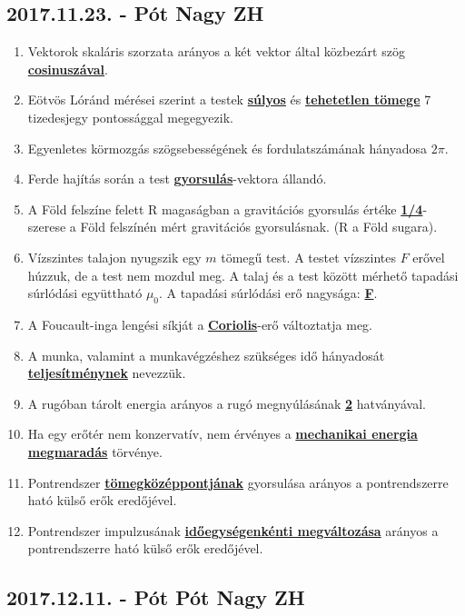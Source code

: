\documentclass[../../fizika_kerdesek.tex]{subfiles}
\begin{document}
    \subsection{2017.11.23. - Pót Nagy ZH}

        \begin{enumerate}
            \item Vektorok skaláris szorzata arányos a két vektor által közbezárt szög \underline{\textbf{cosinuszával}}.
            \item Eötvös Lóránd mérései szerint a testek \underline{\textbf{súlyos}} és \underline{\textbf{tehetetlen tömege}} 7 tizedesjegy pontossággal megegyezik.
            \item Egyenletes körmozgás szögsebességének és fordulatszámának hányadosa \textbf{\underline{$2\pi$}}.
            \item Ferde hajítás során a test \underline{\textbf{gyorsulás}}-vektora állandó.
            \item A Föld felszíne felett R magaságban a gravitációs gyorsulás értéke \underline{\textbf{1/4}}-szerese a Föld felszínén mért gravitációs gyorsulásnak. (R a Föld sugara).
            \item Vízszintes talajon nyugszik egy $m$ tömegű test. A testet vízszintes $F$ erővel húzzuk, de a test nem mozdul meg. A talaj és a test között mérhető tapadási súrlódási együttható $\mu_0$. A tapadási súrlódási erő nagysága: \underline{\textbf{F}}.
            \item A Foucault-inga lengési síkját a \underline{\textbf{Coriolis}}-erő változtatja meg. 
            \item A munka, valamint a munkavégzéshez szükséges idő hányadosát \underline{\textbf{teljesítménynek}} nevezzük.
            \item A rugóban tárolt energia arányos a rugó megnyúlásának \underline{\textbf{2}} hatványával.
            \item Ha egy erőtér nem konzervatív, nem érvényes a \underline{\textbf{mechanikai energia megmaradás}} törvénye. 
            \item Pontrendszer \underline{\textbf{tömegközéppontjának}} gyorsulása arányos a pontrendszerre ható külső erők eredőjével.
            \item Pontrendszer impulzusának \underline{\textbf{időegységenkénti megváltozása}} arányos a pontrendszerre ható külső erők eredőjével.
        \end{enumerate}

    \subsection{2017.12.11. - Pót Pót Nagy ZH}
\end{document}
